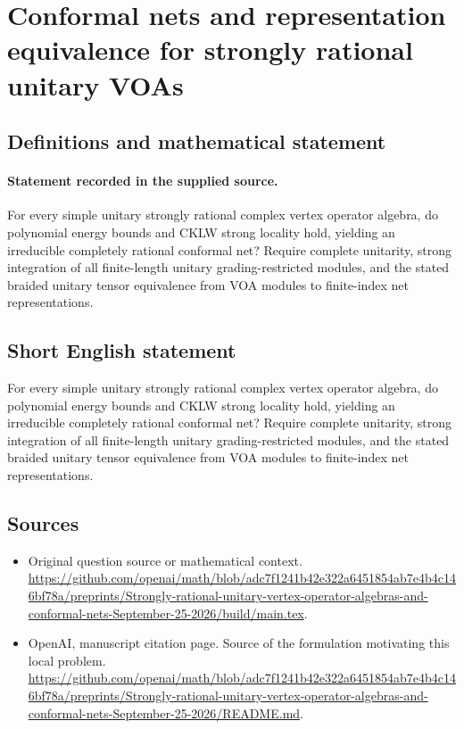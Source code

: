 \documentclass[11pt]{article}
\begin{document}
\section*{Conformal nets and representation equivalence for strongly rational unitary VOAs}\label{statement}
\subsection{Definitions and mathematical statement}
\paragraph{Statement recorded in the supplied source.}
For every simple unitary strongly rational complex vertex operator algebra, do polynomial energy bounds and CKLW strong locality hold, yielding an irreducible completely rational conformal net? Require complete unitarity, strong integration of all finite-length unitary grading-restricted modules, and the stated braided unitary tensor equivalence from VOA modules to finite-index net representations.
\subsection{Short English statement}
For every simple unitary strongly rational complex vertex operator algebra, do polynomial energy bounds and CKLW strong locality hold, yielding an irreducible completely rational conformal net? Require complete unitarity, strong integration of all finite-length unitary grading-restricted modules, and the stated braided unitary tensor equivalence from VOA modules to finite-index net representations.
\subsection{Sources}
\begin{itemize}
\item[S1] Original question source or mathematical context.
\url{https://github.com/openai/math/blob/adc7f1241b42e322a6451854ab7e4b4c146bf78a/preprints/Strongly-rational-unitary-vertex-operator-algebras-and-conformal-nets-September-25-2026/build/main.tex}.
\item[S2] OpenAI, manuscript citation page. Source of the formulation motivating this local problem.
\url{https://github.com/openai/math/blob/adc7f1241b42e322a6451854ab7e4b4c146bf78a/preprints/Strongly-rational-unitary-vertex-operator-algebras-and-conformal-nets-September-25-2026/README.md}.
\end{itemize}
\end{document}
